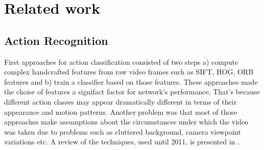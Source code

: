 \documentclass{report}
\begin{document}
\chapter{Related work}




\section{Action Recognition}
First approaches for action classification consisted of two steps a) compute complex handcrafted features from raw video frames
such as SIFT, HOG, ORB features and b) train a classifier based on those features. These approaches made the choise of
features a signifact factor for network's performance. That's because different action classes may appear dramatically
different in terms of their appearance and motion patterns. Another problem was that most of those approaches make
assumptions about the circumstances under which the video was taken due to problems such as cluttered
background, camera viewpoint variations etc. A review of the techniques, used until 2011, is presented in \cite{Aggarwal:2011:HAA:1922649.1922653}. \par
\end{document}
